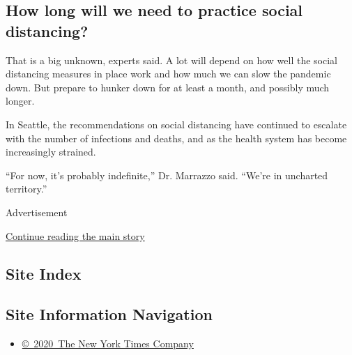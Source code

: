 \hypertarget{how-long-will-we-need-to-practice-social-distancing}{%
\subsection{How long will we need to practice social
distancing?}\label{how-long-will-we-need-to-practice-social-distancing}}

That is a big unknown, experts said. A lot will depend on how well the
social distancing measures in place work and how much we can slow the
pandemic down. But prepare to hunker down for at least a month, and
possibly much longer.

In Seattle, the recommendations on social distancing have continued to
escalate with the number of infections and deaths, and as the health
system has become increasingly strained.

``For now, it's probably indefinite,'' Dr. Marrazzo said. ``We're in
uncharted territory.''

Advertisement

\protect\hyperlink{after-bottom}{Continue reading the main story}

\hypertarget{site-index}{%
\subsection{Site Index}\label{site-index}}

\hypertarget{site-information-navigation}{%
\subsection{Site Information
Navigation}\label{site-information-navigation}}

\begin{itemize}
\tightlist
\item
  \href{https://help.nytimes3xbfgragh.onion/hc/en-us/articles/115014792127-Copyright-notice}{©~2020~The
  New York Times Company}
\end{itemize}

